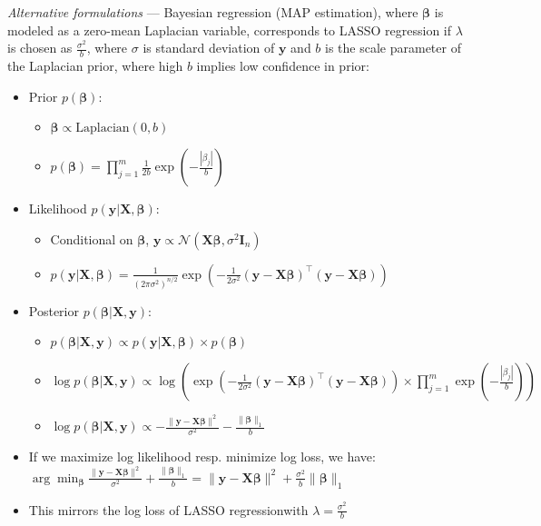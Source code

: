 \emph{Alternative formulations} --- 
Bayesian regression (MAP estimation), where $\boldsymbol{\beta}$ is modeled as a zero-mean Laplacian variable, corresponds to LASSO regression if $\lambda$ is chosen as $\frac{\sigma^2}{b}$, where $\sigma$ is standard deviation of $\boldsymbol{y}$ and $b$ is the scale parameter of the Laplacian prior, where high $b$ implies low confidence in prior:
\begin{itemize}
    \item Prior $p( \boldsymbol{\beta} )$: 
    \begin{itemize}
        \item $\boldsymbol{\beta} \propto \text{Laplacian}(0, b)$
        \item $p( \boldsymbol{\beta} ) = \prod_{j=1}^m \frac{1}{2b} \exp\left(-\frac{|\beta_j|}{b}\right)$
    \end{itemize}
    \item Likelihood $p( \boldsymbol{y} | \boldsymbol{X}, \boldsymbol{\beta} )$: 
    \begin{itemize}
        \item Conditional on $\boldsymbol{\beta}$, $\boldsymbol{y} \propto \mathcal{N}(\boldsymbol{X} \boldsymbol{\beta}, \sigma^2 \boldsymbol{I}_n)$
        \item $p( \boldsymbol{y} | \boldsymbol{X}, \boldsymbol{\beta} ) = \frac{ 1 }{ (2\pi\sigma^2)^{n/2}} \exp\left( -\frac{1}{2\sigma^2} (\boldsymbol{y} - \boldsymbol{X} \boldsymbol{\beta})^\intercal (\boldsymbol{y} - \boldsymbol{X} \boldsymbol{\beta}) \right)$
    \end{itemize}
    \item Posterior $p( \boldsymbol{\beta} | \boldsymbol{X}, \boldsymbol{y} )$: 
    \begin{itemize}
        \item $p( \boldsymbol{\beta} | \boldsymbol{X}, \boldsymbol{y} ) \propto p( \boldsymbol{y} |\boldsymbol{X}, \boldsymbol{\beta} ) \times p( \boldsymbol{\beta} )$
        \item $\log p( \boldsymbol{\beta} | \boldsymbol{X}, \boldsymbol{y} ) \propto \log \left( \exp\left(-\frac{1}{2\sigma^2} (\boldsymbol{y} - \boldsymbol{X} \boldsymbol{\beta})^\intercal (\boldsymbol{y} - \boldsymbol{X} \boldsymbol{\beta})\right) \times \prod_{j=1}^m \exp\left(-\frac{|\beta_j|}{b}\right) \right)$
        \item $\log p( \boldsymbol{\beta} | \boldsymbol{X}, \boldsymbol{y} ) \propto -\frac{\|\boldsymbol{y} - \boldsymbol{X} \boldsymbol{\beta} \|^2}{\sigma^2} - \frac{\|\boldsymbol{\beta}\|_1}{b}$
    \end{itemize}
    \item If we maximize log likelihood resp. minimize log loss, we have: 
    $
    \arg\min_{\boldsymbol{\beta}} \frac{\|\boldsymbol{y} - \boldsymbol{X} \boldsymbol{\beta} \|^2}{\sigma^2} + \frac{\|\boldsymbol{\beta}\|_1}{b} = \|\boldsymbol{y} - \boldsymbol{X} \boldsymbol{\beta} \|^2 + \frac{\sigma^2}{b}\|\boldsymbol{\beta}\|_1
    $
    \item This mirrors the log loss of LASSO regressionwith $\lambda = \frac{\sigma^2}{b}$
\end{itemize}

